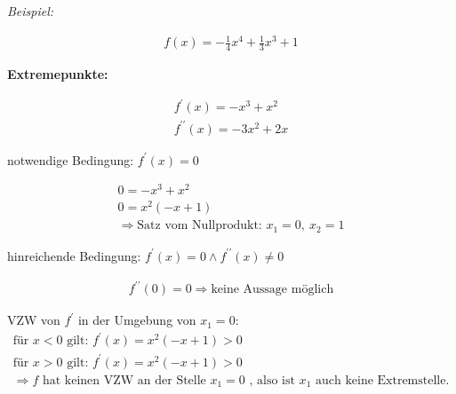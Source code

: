 
\textit{Beispiel:}

\begin{equation*}
    \begin{gathered}
        f(x) = -\frac{1}{4}x^4 + \frac{1}{3}x^3 + 1
    \end{gathered}
\end{equation*}

\textbf{Extremepunkte:}

\begin{equation*}
    \begin{gathered}
        f^\prime(x)=-x^3+x^2 \\
        f^{\prime\prime}(x)=-3x^2 + 2x
    \end{gathered}
\end{equation*}

notwendige Bedingung: $f^\prime(x) = 0$

\begin{equation*}
    \begin{gathered}
        0 = -x^3+x^2 \\
        0 = x^2  (-x+1) \\
        \Rightarrow \text{Satz vom Nullprodukt: } x_1 = 0, \ x_2 = 1
    \end{gathered}
\end{equation*}

hinreichende Bedingung: $f^\prime(x) = 0 \land f^{\prime\prime}(x)\neq0$

\begin{equation*}
    \begin{gathered}
        f^{\prime\prime}(0)=0 \Rightarrow \text{keine Aussage möglich}
    \end{gathered}
\end{equation*}

VZW von $f^\prime$ in der Umgebung von $x_1 = 0$:
\begin{equation*}
    \begin{gathered}
        \text{für } x < 0 \text{ gilt: } f^\prime(x)=x^2(-x+1) > 0 \\
        \text{für } x > 0 \text{ gilt: } f^\prime(x)=x^2(-x+1) > 0 \\
        \Rightarrow f \text{ hat keinen VZW an der Stelle } x_1 = 0 \text{ , also ist } x_1 \text{ auch keine Extremstelle.}
    \end{gathered}
\end{equation*}


